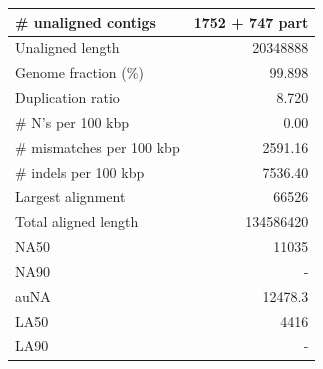 \documentclass[12pt,a4paper]{article}
\begin{document}
\begin{table}[ht]
\begin{center}
\begin{tabular}{|l*{1}{|r}|}
\# unaligned contigs & 1752 + 747 part \\ \hline
Unaligned length & 20348888 \\ \hline
Genome fraction (\%) & 99.898 \\ \hline
Duplication ratio & 8.720 \\ \hline
\# N's per 100 kbp & 0.00 \\ \hline
\# mismatches per 100 kbp & 2591.16 \\ \hline
\# indels per 100 kbp & 7536.40 \\ \hline
Largest alignment & 66526 \\ \hline
Total aligned length & 134586420 \\ \hline
NA50 & 11035 \\ \hline
NA90 & - \\ \hline
auNA & 12478.3 \\ \hline
LA50 & 4416 \\ \hline
LA90 & - \\ \hline
\end{tabular}
\end{center}
\end{table}
\end{document}
